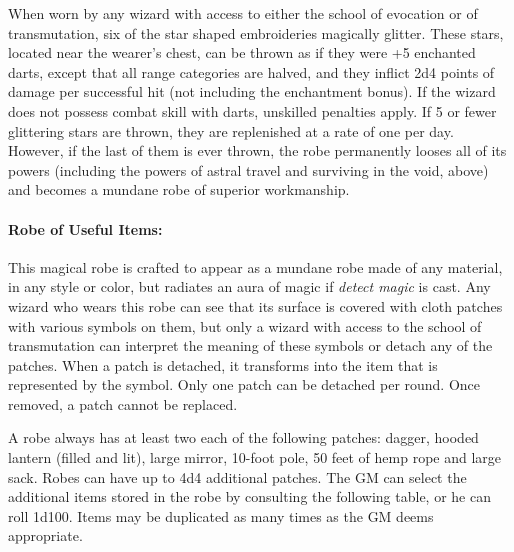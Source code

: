 \begin{multicols}{2}
When worn by any wizard with access to either the school of evocation or of transmutation, six of the star shaped embroideries magically glitter.  These stars, located near the wearer's chest, can be thrown as if they were +5 enchanted darts, except that all range categories are halved, and they inflict 2d4 points of damage per successful hit (not including the enchantment bonus).  If the wizard does not possess combat skill with darts, unskilled penalties apply.  If 5 or fewer glittering stars are thrown, they are replenished at a rate of one per day.  However, if the last of them is ever thrown, the robe permanently looses all of its powers (including the powers of astral travel and surviving in the void, above) and becomes a mundane robe of superior workmanship.

\paragraph{Robe of Useful Items:} This magical robe is crafted to appear as a mundane robe made of any material, in any style or color, but radiates an aura of magic if \textit{detect magic} is cast.  Any wizard who wears this robe can see that its surface is covered with cloth patches with various symbols on them, but only a wizard with access to the school of transmutation can interpret the meaning of these symbols or detach any of the patches.  When a patch is detached, it transforms into the item that is represented by the symbol.  Only one patch can be detached per round.  Once removed, a patch cannot be replaced.  

A robe always has at least two each of the following patches: dagger, hooded lantern (filled and lit), large mirror, 10-foot pole, 50 feet of hemp rope and large sack.  Robes can have up to 4d4 additional patches.  The GM can select the additional items stored in the robe by consulting the following table, or he can roll 1d100.  Items may be duplicated as many times as the GM deems appropriate.


\end{multicols}
